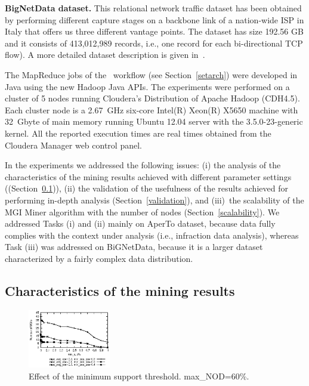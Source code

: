 \noindent  \textbf{BigNetData dataset.} This relational network traffic dataset has been obtained by performing different
capture stages on a backbone link of a nation-wide ISP in Italy that offers us three different vantage points.
The dataset has size 192.56 GB and it consists of 413,012,989 records, i.e., one record for each bi-directional TCP flow).
A more detailed dataset description is given in~\cite{ISPA13}.

The MapReduce jobs of the \SeTAB\ workflow (see Section~\ref{setarch}) were
developed in Java using the new Hadoop Java APIs.
The experiments were performed on a cluster of 5 nodes running Cloudera's
Distribution of Apache Hadoop (CDH4.5). Each cluster node is a 2.67~GHz
six-core Intel(R) Xeon(R) X5650 machine with 32~Gbyte of main memory running
Ubuntu 12.04 server with the 3.5.0-23-generic kernel. All the reported
execution times are real times obtained from the Cloudera Manager web control panel.

In the experiments we addressed the following issues: 
(i) the analysis of the characteristics of the mining results achieved with different parameter settings ((Section~\ref{impactparam})), 
(ii) the validation of the usefulness of the results achieved for performing in-depth analysis (Section~\ref{validation}), 
and (iii)~the scalability of the MGI Miner algorithm with the number of nodes (Section~\ref{scalability}). 
We addressed Tasks (i) and (ii) mainly on AperTo dataset, because data fully complies with the context under analysis (i.e., infraction data analysis), whereas
Task (iii) was addressed on BiGNetData, because it is a larger dataset characterized by a fairly complex data distribution.

\subsection{Characteristics of the mining results}
\label{impactparam}

\begin{figure}[t]
\centering
\includegraphics[width=0.32\textwidth]{chapters/mgi/grafici/EffectMinsup.eps}
\caption{Effect of the minimum support threshold. max\_NOD=60\%.}
\label{fig:minsup}
\end{figure}

